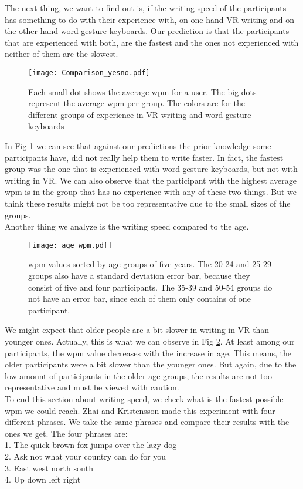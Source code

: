 The next thing, we want to find out is, if the writing speed of the participants has something to do with their experience with, on one hand VR writing and on the other hand word-gesture keyboards. Our prediction is that the participants that are experienced with both, are the fastest and the ones not experienced with neither of them are the slowest.\\
\begin{figure}[H]
    \centering
    \texttt{[image: Comparison\_yesno.pdf]}
    \caption{Each small dot shows the average wpm for a user. The big dots represent the average wpm per group. The colors are for the different groups of experience in VR writing and word-gesture keyboards}
    \label{fig:WPM_yesno}
\end{figure}
In Fig \ref{fig:WPM_yesno} we can see that against our predictions the prior knowledge some participants have, did not really help them to write faster. In fact, the fastest group was the one that is experienced with word-gesture keyboards, but not with writing in VR. We can also observe that the participant with the highest average wpm is in the group that has no experience with any of these two things. But we think these results might not be too representative due to the small sizes of the groups.\\

Another thing we analyze is the writing speed compared to the age.
\begin{figure}[H]
    \centering
    \texttt{[image: age\_wpm.pdf]}
    \caption{wpm values sorted by age groups of five years. The 20-24 and 25-29 groups also have a standard deviation error bar, because they consist of five and four participants. The 35-39 and 50-54 groups do not have an error bar, since each of them only contains of one participant.}
    \label{fig:WPM_age}
\end{figure}

We might expect that older people are a bit slower in writing in VR than younger ones. Actually, this is what we can observe in Fig \ref{fig:WPM_age}. At least among our participants, the wpm value decreases with the increase in age. This means, the older participants were a bit slower than the younger ones. But again, due to the low amount of participants in the older age groups, the results are not too representative and must be viewed with caution.\\

To end this section about writing speed, we check what is the fastest possible wpm we could reach. Zhai and Kristensson \cite{Kristensson2004SHARK2AL} made this experiment with four different phrases. We take the same phrases and compare their results with the ones we get. The four phrases are:\\
1. The quick brown fox jumps over the lazy dog\\
2. Ask not what your country can do for you\\
3. East west north south\\
4. Up down left right\\

